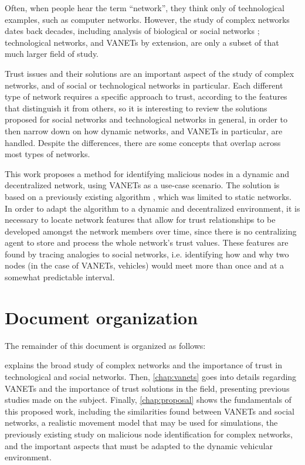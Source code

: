 Often, when people hear the term ``network'', they think only of technological examples, such as computer networks.
However, the study of complex networks dates back decades, including analysis of biological or social networks \cite{wang2003complex} \cite{newmannetworks}; technological networks, and VANETs by extension, are only a subset of that much larger field of study.

Trust issues and their solutions are an important aspect of the study of complex networks, and of social or technological networks in particular.
Each different type of network requires a specific approach to trust, according to the features that distinguish it from others, so it is interesting to review the solutions proposed for social networks and technological networks in general, in order to then narrow down on how dynamic networks, and VANETs in particular, are handled.
Despite the differences, there are some concepts that overlap across most types of networks.

This work proposes a method for identifying malicious nodes in a dynamic and decentralized network, using VANETs as a use-case scenario.
The solution is based on a previously existing algorithm \cite{vernize2015malicious}, which was limited to static networks.
In order to adapt the algorithm to a dynamic and decentralized environment, it is necessary to locate network features that allow for trust relationships to be developed amongst the network members over time, since there is no centralizing agent to store and process the whole network's trust values.
These features are found by tracing analogies to social networks, i.e. identifying how and why two nodes (in the case of VANETs, vehicles) would meet more than once and at a somewhat predictable interval.




\section{Document organization}
The remainder of this document is organized as follows:

 explains the broad study of complex networks and the importance of trust in technological and social networks.
Then, \cref{chap:vanets} goes into details regarding VANETs and the importance of trust solutions in the field, presenting previous studies made on the subject.
Finally, \cref{chap:proposal} shows the fundamentals of this proposed work, including the similarities found between VANETs and social networks, a realistic movement model that may be used for simulations, the previously existing study on malicious node identification for complex networks, and the important aspects that must be adapted to the dynamic vehicular environment.
